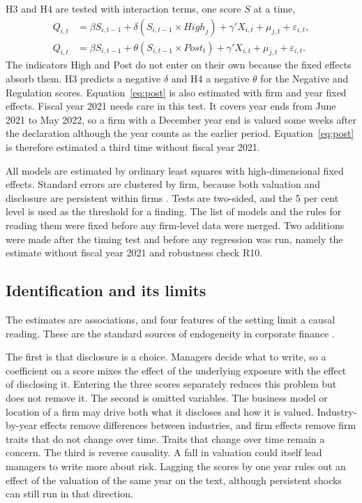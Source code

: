\documentclass[12pt,a4paper]{article}
\begin{document}
H3 and H4 are tested with interaction terms, one score $S$ at a time,
\begin{align}
Q_{i,t} &= \beta S_{i,t-1} + \delta \left( S_{i,t-1} \times \mathit{High}_{j} \right) + \gamma' X_{i,t} + \mu_{j,t} + \varepsilon_{i,t}, \label{eq:high}\\
Q_{i,t} &= \beta S_{i,t-1} + \theta \left( S_{i,t-1} \times \mathit{Post}_{t} \right) + \gamma' X_{i,t} + \mu_{j,t} + \varepsilon_{i,t}. \label{eq:post}
\end{align}
The indicators High and Post do not enter on their own because the fixed effects absorb them. H3 predicts a negative $\delta$ and H4 a negative $\theta$ for the Negative and Regulation scores. Equation~\eqref{eq:post} is also estimated with firm and year fixed effects. Fiscal year 2021 needs care in this test. It covers year ends from June 2021 to May 2022, so a firm with a December year end is valued some weeks after the declaration although the year counts as the earlier period. Equation~\eqref{eq:post} is therefore estimated a third time without fiscal year 2021.

All models are estimated by ordinary least squares with high-dimensional fixed effects. Standard errors are clustered by firm, because both valuation and disclosure are persistent within firms \citep{petersen2009}. Tests are two-sided, and the 5 per cent level is used as the threshold for a finding. The list of models and the rules for reading them were fixed before any firm-level data were merged. Two additions were made after the timing test and before any regression was run, namely the estimate without fiscal year 2021 and robustness check R10.

\subsection{Identification and its limits}

The estimates are associations, and four features of the setting limit a causal reading. These are the standard sources of endogeneity in corporate finance \citep{roberts2013}.

The first is that disclosure is a choice. Managers decide what to write, so a coefficient on a score mixes the effect of the underlying exposure with the effect of disclosing it. Entering the three scores separately reduces this problem but does not remove it. The second is omitted variables. The business model or location of a firm may drive both what it discloses and how it is valued. Industry-by-year effects remove differences between industries, and firm effects remove firm traits that do not change over time. Traits that change over time remain a concern. The third is reverse causality. A fall in valuation could itself lead managers to write more about risk. Lagging the scores by one year rules out an effect of the valuation of the same year on the text, although persistent shocks can still run in that direction.
\end{document}
